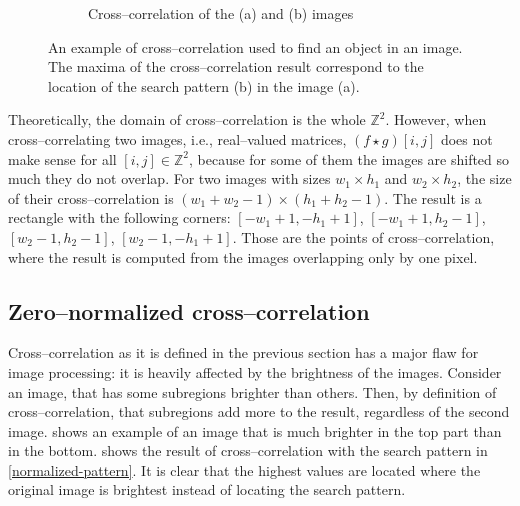 \begin{figure}[b!]
\begin{subfigure}{.5\textwidth}
		\caption{Cross--correlation of the (a) and (b) images}
		\label{2d-correlation-example-result}
	\end{subfigure}
	
	\caption{An example of cross--correlation used to find an object in an image. The maxima of the cross--correlation result correspond to the location of the search pattern (b) in the image (a).}
	\label{2d-correlation-example}
\end{figure}

Theoretically, the domain of cross--correlation is the whole $\mathbb{Z}^2$. However, when cross--correlating two images, i.e., real--valued matrices, $(f \star g)[i,j]$ does not make sense for all $[i,j] \in \mathbb{Z}^2$, because for some of them the images are shifted so much they do not overlap. For two images with sizes $w_1 \times h_1$ and $w_2 \times h_2$, the size of their cross--correlation is $(w_1 + w_2 - 1) \times (h_1 + h_2 - 1)$. The result is a rectangle with the following corners: $[-w_1+1,-h_1+1]$, $[-w_1+1,h_2-1]$, $[w_2-1,h_2-1]$, $[w_2-1,-h_1+1]$. Those are the points of cross--correlation, where the result is computed from the images overlapping only by one pixel.

\subsection{Zero--normalized cross--correlation}

Cross--correlation as it is defined in the previous section has a major flaw for image processing: it is heavily affected by the brightness of the images. Consider an image, that has some subregions brighter than others. Then, by definition of cross--correlation, that subregions add more to the result, regardless of the second image.  shows an example of an image that is much brighter in the top part than in the bottom.  shows the result of cross--correlation with the search pattern in \cref{normalized-pattern}. It is clear that the highest values are located where the original image is brightest instead of locating the search pattern.

